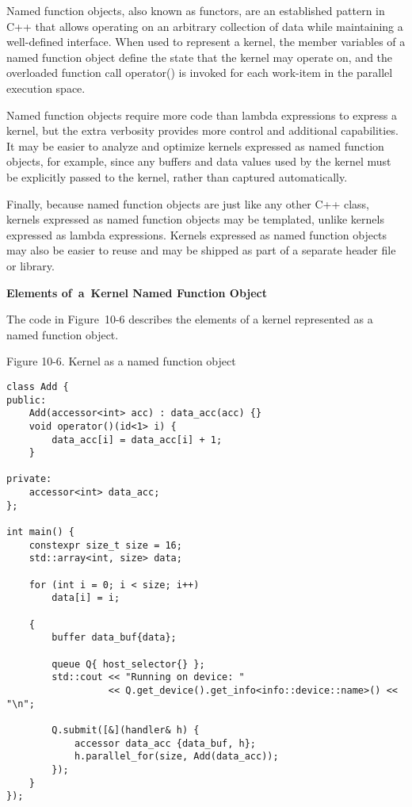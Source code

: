 Named function objects, also known as functors, are an established pattern in C++ that allows operating on an arbitrary collection of data while maintaining a well-defined interface. When used to represent a kernel, the member variables of a named function object define the state that the kernel may operate on, and the overloaded function call operator() is invoked for each work-item in the parallel execution space.\par

Named function objects require more code than lambda expressions to express a kernel, but the extra verbosity provides more control and additional capabilities. It may be easier to analyze and optimize kernels expressed as named function objects, for example, since any buffers and data values used by the kernel must be explicitly passed to the kernel, rather than captured automatically.\par

Finally, because named function objects are just like any other C++ class, kernels expressed as named function objects may be templated, unlike kernels expressed as lambda expressions. Kernels expressed as named function objects may also be easier to reuse and may be shipped as part of a separate header file or library.\par

\hspace*{\fill} \par %
\textbf{Elements of a Kernel Named Function Object}

The code in Figure 10-6 describes the elements of a kernel represented as a named function object.\par

\hspace*{\fill} \par %
Figure 10-6. Kernel as a named function object
\begin{lstlisting}[caption={}]
class Add {
public:
	Add(accessor<int> acc) : data_acc(acc) {}
	void operator()(id<1> i) {
		data_acc[i] = data_acc[i] + 1;
	}

private:
	accessor<int> data_acc;
};

int main() {
	constexpr size_t size = 16;
	std::array<int, size> data;
	
	for (int i = 0; i < size; i++)
		data[i] = i;
		
	{
		buffer data_buf{data};
		
		queue Q{ host_selector{} };
		std::cout << "Running on device: "
				  << Q.get_device().get_info<info::device::name>() << "\n";
				  
		Q.submit([&](handler& h) {
			accessor data_acc {data_buf, h};
			h.parallel_for(size, Add(data_acc));
		});
	}
});
\end{lstlisting}

